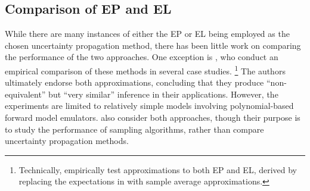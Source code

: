 \documentclass[12pt]{article}
\begin{document}
\subsection{Comparison of EP and EL}
While there are many instances of either the EP or EL being employed as the chosen uncertainty
propagation method, there has been little work on comparing the performance of the two approaches.
One exception is \citet{BurknerSurrogate}, who conduct an empirical comparison of these methods
in several case studies. 
\footnote{Technically, \citet{BurknerSurrogate} empirically test approximations to both EP and EL, derived
by replacing the expectations in  with sample average approximations.}
The authors ultimately endorse both approximations, concluding that they produce ``non-equivalent''
but ``very similar'' inference in their applications. However, the experiments are limited to relatively simple 
models involving polynomial-based forward model emulators. \citet{garegnani2021NoisyMCMC} also
consider both approaches, though their purpose is to study the performance of sampling algorithms, rather
than compare uncertainty propagation methods.
\end{document}
